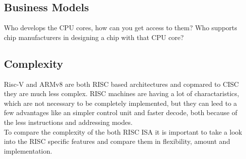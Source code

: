 \documentclass[conference]{IEEEtran}
\begin{document}
	\subsection{Business Models}
	Who develops the CPU cores, how can you get access to them? Who supports chip manufacturers in designing a chip with that CPU core?
	\subsection{Complexity}
	Risc-V and ARMv8 are both \gls{RISC} based architectures and copmared to \gls{CISC} they are much less complex. \gls{RISC} machines are having a lot of charactaristics, which are not necessary to be completely implemented, but they can leed to a few advantages like an simpler control unit and faster decode, both because of the less instructions and addressing modes. \cite{George1990}\\
	To compare the complexity of the both \gls{RISC} \gls{ISA} it is important to take a look into the RISC specific features and compare them in flexibility, amount and implementation.
\end{document}
